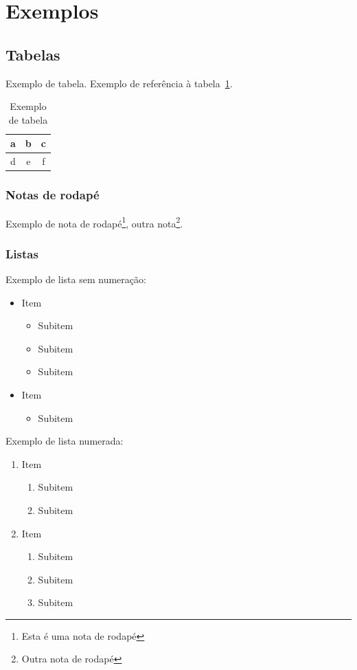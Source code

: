 \documentclass[11pt,a4paper]{article}
\begin{document}
\section{Exemplos}

\subsection{Tabelas}

Exemplo de tabela. Exemplo de referência à tabela~\ref{tab:exemplo}.

\begin{table}[htb]
\centering
\caption{Exemplo de tabela} \label{tab:exemplo}
\begin{tabular}{|c|c|c|} \hline
a & b & c \\ \hline
d & e & f \\
\hline
\end{tabular}
\end{table}

\subsubsection{Notas de rodapé}

Exemplo de nota de rodapé\footnote{Esta é uma nota de rodapé}, outra
nota\footnote{Outra nota de rodapé}.

\subsubsection{Listas}

Exemplo de lista sem numeração:
\begin{itemize}
 \item Item
  \begin{itemize}
   \item Subitem
   \item Subitem
   \item Subitem
  \end{itemize}
 \item Item
  \begin{itemize}
   \item Subitem
  \end{itemize}
\end{itemize}


\noindent %
Exemplo de lista numerada:
\begin{enumerate}
 \item Item
  \begin{enumerate}
   \item Subitem
   \item Subitem
  \end{enumerate}
 \item Item
  \begin{enumerate}
   \item Subitem
   \item Subitem
   \item Subitem
  \end{enumerate}
\end{enumerate}
\end{document}
